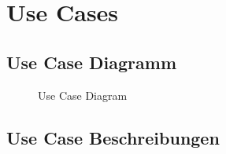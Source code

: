 \chapter{Use Cases}
\label{chap:usecases}

\section{Use Case Diagramm}
\begin{figure}[htbp]
    \centering
    
    \caption{Use Case Diagram}
\end{figure}


\section{Use Case Beschreibungen}
\label{usecase:description}































